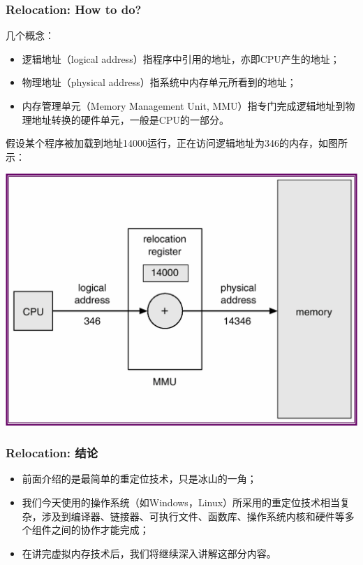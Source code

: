 \documentclass[CJKutf8,xcolor=pdftex,dvipsnames,table]{beamer}
\begin{document}
\begin{CJK*}{UTF8}{song}
  \begin{frame}
  \frametitle{Relocation: How to do?} \pause
  \begin{itemize}
  \item{几个概念：} \pause
    \begin{itemize}
    \item{逻辑地址（logical address）指程序中引用的地址，亦即CPU产生的地址；} \pause
    \item{物理地址（physical address）指系统中内存单元所看到的地址；} \pause
    \item{内存管理单元（Memory Management Unit, MMU）指专门完成逻辑地址到物理地址转换的硬件单元，一般是CPU的一部分。} \pause
    \end{itemize}
    \begin{minipage}[c]{0.4\textwidth}
    \item{假设某个程序被加载到地址14000运行，正在访问逻辑地址为346的内存，如图所示：} \pause
    \end{minipage}%
    \begin{minipage}[c]{0.6\textwidth}
      \centering
      \includegraphics[scale=.3]{v6f9-2}
    \end{minipage}
  \end{itemize}
  \end{frame}
  
  \begin{frame}
  \frametitle{Relocation: 结论} \pause
  \begin{itemize}
  \item{前面介绍的是最简单的重定位技术，只是冰山的一角；} \pause
  \item{我们今天使用的操作系统（如Windows，Linux）所采用的重定位技术相当复杂，涉及到编译器、链接器、可执行文件、函数库、操作系统内核和硬件等多个组件之间的协作才能完成；} \pause
  \item{在讲完虚拟内存技术后，我们将继续深入讲解这部分内容。}
  \end{itemize}
  \end{frame}
  

\end{CJK*}
\end{document}
